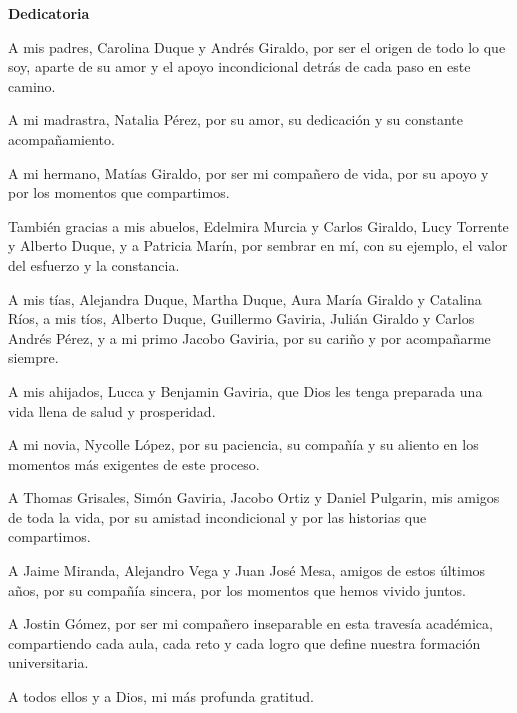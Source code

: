 
\normalsize


\noindent \begin{center}
\textbf{Dedicatoria}
\par\end{center}

 \vspace{0.7mm}
 
 \begin{center}
     A mis padres, Carolina Duque y Andrés Giraldo, por ser el origen de todo lo que soy, aparte de su amor y el apoyo incondicional detrás de cada paso en este camino.
     
     A mi madrastra, Natalia Pérez, por su amor, su dedicación y su constante acompañamiento.
     
     A mi hermano, Matías Giraldo, por ser mi compañero de vida, por su apoyo y por los momentos que compartimos.
     
     También gracias a mis abuelos, Edelmira Murcia y Carlos Giraldo, Lucy Torrente y Alberto Duque, y a Patricia Marín, por sembrar en mí, con su ejemplo, el valor del esfuerzo y la constancia.
     
     A mis tías, Alejandra Duque, Martha Duque, Aura María Giraldo y Catalina Ríos, a mis tíos, Alberto Duque, Guillermo Gaviria, Julián Giraldo y Carlos Andrés Pérez, y a mi primo Jacobo Gaviria, por su cariño y por acompañarme siempre.
     
     A mis ahijados, Lucca y Benjamin Gaviria, que Dios les tenga preparada una vida llena de salud y prosperidad.
     
     A mi novia, Nycolle López, por su paciencia, su compañía y su aliento en los momentos más exigentes de este proceso.
     
     A Thomas Grisales, Simón Gaviria, Jacobo Ortiz y Daniel Pulgarin, mis amigos de toda la vida, por su amistad incondicional y por las historias que compartimos.
     
     A Jaime Miranda, Alejandro Vega y Juan José Mesa, amigos de estos últimos años, por su compañía sincera, por los momentos que hemos vivido juntos.
     
     A Jostin Gómez, por ser mi compañero inseparable en esta travesía académica, compartiendo cada aula, cada reto y cada logro que define nuestra formación universitaria.
     
     A todos ellos y a Dios, mi más profunda gratitud. \vspace{0.5cm}
 \end{center}
 
